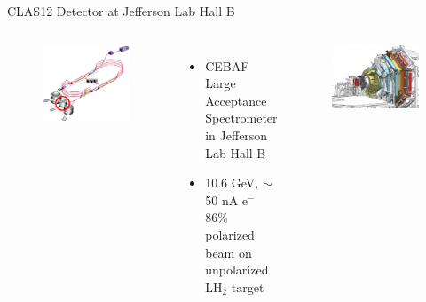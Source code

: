 \documentclass[aspectratio=169]{beamer}
\begin{document}
\begin{frame}{CLAS12 Detector at Jefferson Lab Hall B} \label{frame:datasets}
        \vspace{-0.5cm}
        \begin{columns}[t, onlytextwidth]
                \begin{figure}[t!]
                    \includegraphics[width=.6349\textwidth]{DNP/jlab_hall_b_circled.jpg}
                    
                    
                \end{figure}
                \vspace{-0.45cm}
                  \begin{itemize}
                    \setlength\itemsep{1em}
                    \item CEBAF Large Acceptance Spectrometer in Jefferson Lab Hall B
                    \item 10.6 GeV, $\sim$ 50 nA e$^-$ 86\% polarized beam on unpolarized LH$_2$ target
                    \end{itemize}
                    
                \begin{figure}[t!]
                    \includegraphics[width=.765899\textwidth]{DNP/CLASdetector.jpg}
                    

\end{figure}
\end{columns}
\end{frame}
\end{document}
